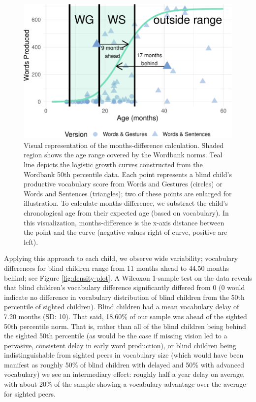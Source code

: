 \documentclass[
  man,floatsintext]{apa6}
\begin{document}
\begin{figure}
\centering
\includegraphics{VI_CDI_manuscript_files/figure-latex/growth-curve-illustration-1.pdf}
\caption{\label{fig:growth-curve-illustration}Visual representation of the months-difference calculation. Shaded region shows the age range covered by the Wordbank norms. Teal line depicts the logistic growth curves constructed from the Wordbank 50th percentile data. Each point represents a blind child's productive vocabulary score from Words and Gestures (circles) or Words and Sentences (triangles); two of these points are enlarged for illustration. To calculate months-difference, we substract the child's chronological age from their expected age (based on vocabulary). In this visualization, months-difference is the x-axis distance between the point and the curve (negative values right of curve, positive are left).}
\end{figure}

Applying this approach to each child, we observe wide variability; vocabulary differences for blind children range from 11 months ahead to 44.50 months behind; see Figure \ref{fig:density-plot}. A Wilcoxon 1-sample test on the data reveals that blind children's vocabulary difference significantly differed from 0 (0 would indicate no difference in vocabulary distribution of blind children from the 50th percentile of sighted children). Blind children had a mean vocabulary delay of 7.20 months (SD: 10). That said, 18.60\% of our sample was ahead of the sighted 50th percentile norm. That is, rather than all of the blind children being behind the sighted 50th percentile (as would be the case if missing vision led to a pervasive, consistent delay in early word production), or blind children being indistinguishable from sighted peers in vocabulary size (which would have been manifest as roughly 50\% of blind children with delayed and 50\% with advanced vocabulary) we see an intermediary effect: roughly half a year delay on average, with about 20\% of the sample showing a vocabulary advantage over the average for sighted peers.
\end{document}
